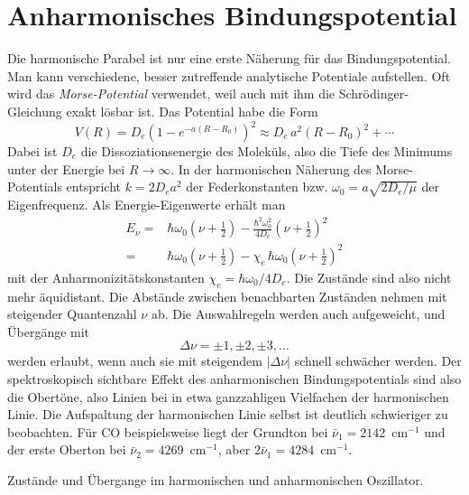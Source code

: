 \section{Anharmonisches Bindungspotential}

Die harmonische Parabel ist nur eine erste Näherung für das Bindungspotential. Man kann verschiedene, besser zutreffende analytische Potentiale aufstellen. Oft wird das \emph{Morse-Potential} verwendet, weil auch mit ihm  die Schrödinger-Gleichung exakt lösbar ist. Das Potential habe die Form
\begin{equation}
 V(R) = D_e \left( 1 - e^{-a (R - R_0)} \right)^2 \approx D_e \, a^2 (R - R_0)^2 + \cdots
\end{equation}
Dabei ist $D_e$ die Dissoziationsenergie des Moleküls, also die Tiefe des Minimums unter der Energie bei $R \rightarrow \infty$. In der harmonischen Näherung des Morse-Potentials entspricht $k = 2 D_e a^2$ der Federkonstanten bzw. $\omega_0 = a \sqrt{2 D_e / \mu}$ der Eigenfrequenz. Als Energie-Eigenwerte erhält man
\begin{align}
 E_\nu =&  \hbar \omega_0 \left( \nu  + \frac{1}{2} \right)
 - \frac{\hbar^2 \omega_0^2}{4 D_e} \left( \nu  + \frac{1}{2} \right)^2 \\
 = &
 \hbar \omega_0 \left( \nu  + \frac{1}{2} \right)
 - \chi_e \, \hbar \omega_0  \left( \nu  + \frac{1}{2} \right)^2
\end{align}
mit der Anharmonizitätskonstanten $\chi_e =\hbar \omega_0 / 4 D_e$.
Die Zustände sind also nicht mehr äquidistant. Die Abstände zwischen benachbarten Zuständen nehmen mit steigender Quantenzahl $\nu$ ab. Die Auswahlregeln werden auch aufgeweicht, und Übergänge mit 
\begin{equation}
\Delta \nu = \pm 1, \pm 2 , \pm 3, \dots
\end{equation}
werden erlaubt, wenn auch sie mit steigendem $|\Delta \nu |$ schnell schwächer werden. Der spektroskopisch sichtbare Effekt des anharmonischen Bindungspotentials sind also die Obertöne, also Linien bei in etwa ganzzahligen Vielfachen der harmonischen Linie. Die Aufspaltung der harmonischen Linie selbst ist deutlich schwieriger zu beobachten. Für CO beispielsweise liegt der Grundton bei $\bar{\nu}_1 = 2142$~cm$^{-1}$ und der erste Oberton bei 
 $\bar{\nu}_2 = 4269$~cm$^{-1}$, aber $2 \bar{\nu}_1 = 4284$~cm$^{-1}$.
 
\begin{marginfigure}
\caption{Zustände und Übergange im harmonischen und anharmonischen Oszillator.}
\end{marginfigure}
 
